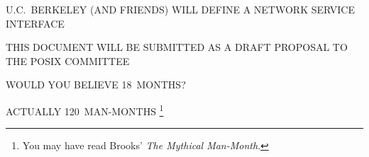 \begin{bwslide}

\begin{nrtc}
\item	U.C.~BERKELEY (AND FRIENDS) WILL DEFINE A NETWORK SERVICE INTERFACE

\item	THIS DOCUMENT WILL BE SUBMITTED AS A DRAFT PROPOSAL TO THE POSIX
	COMMITTEE
\end{nrtc}
\end{bwslide}


\begin{bwslide}

\begin{nrtc}
\item	WOULD YOU BELIEVE 18~MONTHS?

\item	ACTUALLY 120~MAN-MONTHS%
	\footnote{You may have read Brooks' {\em The Mythical Man-Month}.}
\end{nrtc}
\end{bwslide}



